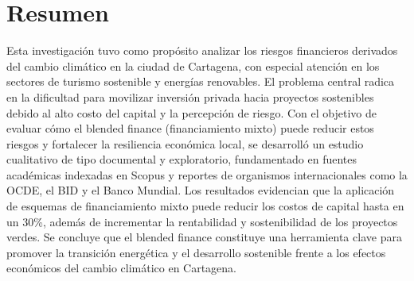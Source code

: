 \section{Resumen}

Esta investigación tuvo como propósito analizar los riesgos financieros derivados del cambio climático en la ciudad de Cartagena, con especial atención en los sectores de turismo sostenible y energías renovables. El problema central radica en la dificultad para movilizar inversión privada hacia proyectos sostenibles debido al alto costo del capital y la percepción de riesgo. Con el objetivo de evaluar cómo el blended finance (financiamiento mixto) puede reducir estos riesgos y fortalecer la resiliencia económica local, se desarrolló un estudio cualitativo de tipo documental y exploratorio, fundamentado en fuentes académicas indexadas en Scopus y reportes de organismos internacionales como la OCDE, el BID y el Banco Mundial. Los resultados evidencian que la aplicación de esquemas de financiamiento mixto puede reducir los costos de capital hasta en un 30\%, además de incrementar la rentabilidad y sostenibilidad de los proyectos verdes. Se concluye que el blended finance constituye una herramienta clave para promover la transición energética y el desarrollo sostenible frente a los efectos económicos del cambio climático en Cartagena.